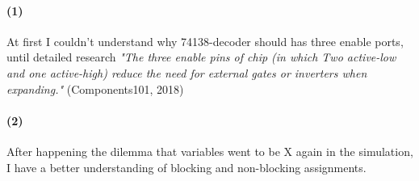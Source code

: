 \documentclass[onecolumn, oneside, ctexart]{SUSTechHomework}
\begin{document}
\paragraph{(1)}At first I couldn't understand why 74138-decoder should has three enable ports, until detailed research \textit{"The three enable pins of chip (in which Two active-low and one active-high) reduce the need for external gates or inverters when expanding."} (Components101, 2018)
\paragraph{(2)}After happening the dilemma that variables went to be X again in the simulation, I have a better understanding of blocking and non-blocking assignments.
\end{document}
